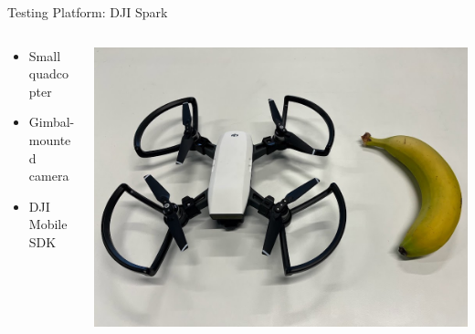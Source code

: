 \documentclass[aspectratio=169]{beamer}
\begin{document}
\begin{frame}{Testing Platform: DJI Spark}
	\begin{columns}
	\begin{column}{0.5\textwidth}
	\begin{itemize}
		\item Small quadcopter
		\item Gimbal-mounted camera
		\item DJI Mobile SDK
	\end{itemize}
	\end{column}
	\begin{column}{0.5\textwidth}
		\centering
		\includegraphics[width=\textwidth]{./images/dji_spark}
	\end{column}
	\end{columns}
\end{frame}
\end{document}
